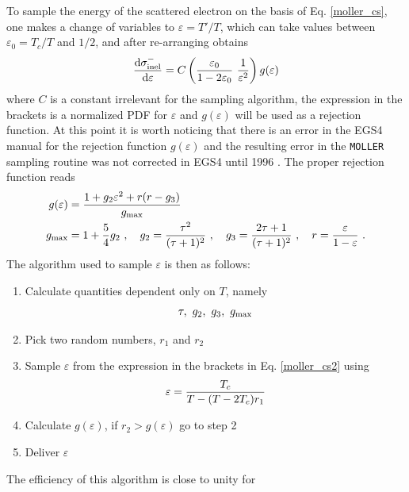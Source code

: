 To sample the energy of the scattered electron on the basis of
Eq. \eqref{moller_cs}, one makes a change of variables to
$\varepsilon = T'/T$, which can take values between
$\varepsilon_0  = T_c/T$ and $1/2$, and after re-arranging
obtains \cite{Ne85}
\begin{equation}
\label{moller_cs2}
{{\rm d} \sigma_{\rm inel}^- \over  {\rm d} \varepsilon} =
C \left( {\varepsilon_0 \over 1 - 2 \varepsilon_0}~\frac{1}{\varepsilon^2}
\right) g(\varepsilon)
\end{equation}
where $C$ is a constant irrelevant for the sampling algorithm,
the expression in the brackets is a normalized PDF for $\varepsilon$
and $g(\varepsilon)$ will be used as a rejection function.
At this point it is worth noticing that there is an error in the EGS4 manual
for the rejection function $g(\varepsilon)$ and the resulting error
in the {\tt MOLLER} sampling routine was not
corrected in EGS4 until 1996 \cite{Bi96b}. The proper rejection function
reads
\begin{equation}
\begin{split}
g(\varepsilon) &= {1 + g_2 \varepsilon^2 + r (r - g_3) \over
g_{\rm max} } \\ g_{\rm max} &= 1 + \frac{5}{4} g_2~, \quad
g_2 = {\tau^2 \over (\tau + 1)^2}~, \quad g_3 = {2 \tau + 1 \over (\tau+1)^2}~,
\quad r = {\varepsilon \over 1 - \varepsilon } ~.
\end{split}
\end{equation}
The algorithm used to sample $\varepsilon$ is then as follows:
\begin{enumerate}
\item
Calculate quantities dependent only on $T$, namely
\begin{displaymath}
\tau,~g_2,~g_3,~g_{\rm max}
\end{displaymath}
\item Pick two random numbers, $r_1$ and $r_2$
\item Sample $\varepsilon$ from the expression in the brackets in
Eq. \eqref{moller_cs2} using
\begin{equation}
\varepsilon = {T_c \over T - (T - 2 T_c) r_1}
\end{equation}
\item Calculate $g(\varepsilon)$, if $r_2 > g(\varepsilon)$  go to step 2
\item Deliver $\varepsilon$
\end{enumerate}
The efficiency of this algorithm is close to unity for
